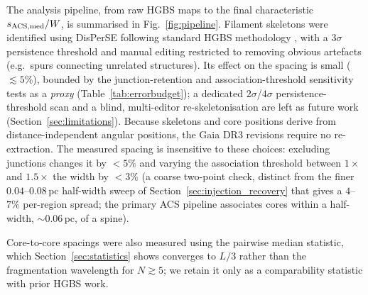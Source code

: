 \documentclass[usenatbib,twoside,twocolumn]{mnras}
\begin{document}
The analysis pipeline, from raw HGBS maps to the final characteristic $s_{\rm ACS,med}/W$, is summarised in Fig.~\ref{fig:pipeline}. Filament skeletons were identified using DisPerSE \citep{Sousbie2011} following standard HGBS methodology \citep{Arzoumanian2011}, with a $3\sigma$ persistence threshold and manual editing restricted to removing obvious artefacts (e.g.\ spurs connecting unrelated structures). Its effect on the spacing is small ($\lesssim5\%$), bounded by the junction-retention and association-threshold sensitivity tests as a \emph{proxy} (Table~\ref{tab:errorbudget}); a dedicated $2\sigma$/$4\sigma$ persistence-threshold scan and a blind, multi-editor re-skeletonisation are left as future work (Section~\ref{sec:limitations}). Because skeletons and core positions derive from distance-independent angular positions, the Gaia DR3 revisions require no re-extraction. The measured spacing is insensitive to these choices: excluding junctions changes it by $<5\%$ and varying the association threshold between $1\times$ and $1.5\times$ the width by $<3\%$ (a coarse two-point check, distinct from the finer $0.04$--$0.08$\,pc half-width sweep of Section~\ref{sec:injection_recovery} that gives a $4$--$7\%$ per-region spread; the primary ACS pipeline associates cores within a half-width, $\sim0.06$\,pc, of a spine).

Core-to-core spacings were also measured using the pairwise median statistic, which Section~\ref{sec:statistics} shows converges to $L/3$ rather than the fragmentation wavelength for $N\gtrsim5$; we retain it only as a comparability statistic with prior HGBS work.
\end{document}
